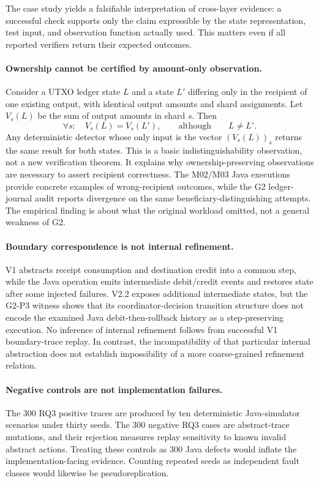 The case study yields a falsifiable interpretation of cross-layer evidence:
a successful check supports only the claim expressible by the state
representation, test input, and observation function actually used. This
matters even if all reported verifiers return their expected outcomes.

\paragraph{Ownership cannot be certified by amount-only observation.}
Consider a UTXO ledger state $L$ and a state $L'$ differing only in the
recipient of one existing output, with identical output amounts and shard
assignments. Let $V_s(L)$ be the sum of output amounts in shard $s$. Then
\[
 \forall s:\quad V_s(L)=V_s(L'),
 \qquad\text{although}\qquad L\ne L'.
\]
Any deterministic detector whose only input is the vector
$(V_s(L))_s$ returns the same result for both states. This is a basic
indistinguishability observation, not a new verification theorem. It explains
why ownership-preserving observations are necessary to assert recipient
correctness. The M02/M03 Java executions provide concrete examples of
wrong-recipient outcomes, while the G2 ledger-journal audit reports divergence on the same
beneficiary-distinguishing attempts. The empirical finding
is about what the original workload omitted, not a general weakness of G2.

\paragraph{Boundary correspondence is not internal refinement.}
V1 abstracts receipt consumption and destination credit into a common step,
while the Java operation emits intermediate debit/credit events and restores
state after some injected failures. V2.2 exposes additional intermediate
states, but the G2-P3 witness shows that its coordinator-decision transition
structure does not encode the examined Java debit-then-rollback history as a
step-preserving execution. No inference of internal refinement follows from
successful V1 boundary-trace replay. In contrast, the incompatibility of that
particular internal abstraction does not establish impossibility of a more
coarse-grained refinement relation.

\paragraph{Negative controls are not implementation failures.}
The 300 RQ3 positive traces are produced by ten deterministic Java-simulator
scenarios under thirty seeds. The 300 negative RQ3 cases are abstract-trace
mutations, and their rejection measures replay sensitivity to known
invalid abstract actions. Treating these controls as 300 Java defects would
inflate the implementation-facing evidence. Counting repeated seeds as
independent fault classes would likewise be pseudoreplication.

